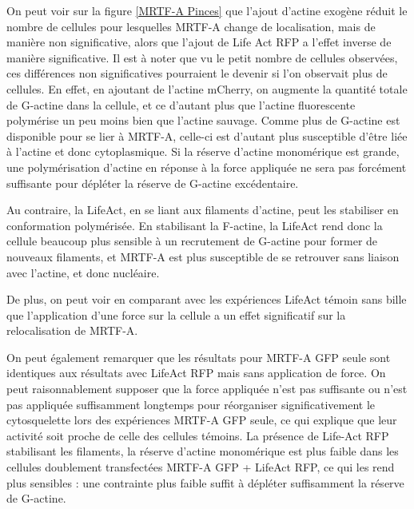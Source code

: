 On peut voir sur la figure \ref{MRTF-A Pinces} que l'ajout d'actine exogène réduit le nombre de cellules pour lesquelles MRTF-A change de localisation, mais de manière non significative, alors que l'ajout de Life Act RFP a l'effet inverse de manière significative. Il est à noter que vu le petit nombre de cellules observées, ces différences non significatives pourraient le devenir si l'on observait plus de cellules. 
En effet, en ajoutant de l'actine mCherry, on augmente la quantité totale de G-actine dans la cellule, et ce d'autant plus que l'actine fluorescente polymérise un peu moins bien que l'actine sauvage. Comme plus de G-actine est disponible pour se lier à MRTF-A, celle-ci est d'autant plus susceptible d'être liée à l'actine et donc cytoplasmique. 
Si la réserve d'actine monomérique est grande, une polymérisation d'actine en réponse à la force appliquée ne sera pas forcément suffisante pour dépléter la réserve de G-actine excédentaire.

Au contraire, la LifeAct, en se liant aux filaments d'actine, peut les stabiliser en conformation polymérisée. En stabilisant la F-actine, la LifeAct rend donc la cellule beaucoup plus sensible à un recrutement de G-actine pour former de nouveaux filaments, et MRTF-A est plus susceptible de se retrouver sans liaison avec l'actine, et donc nucléaire.

De plus, on peut voir en comparant avec les expériences LifeAct témoin sans bille que l'application d'une force sur la cellule a un effet significatif sur la relocalisation de MRTF-A. 

On peut également remarquer que les résultats pour MRTF-A GFP seule sont identiques aux résultats avec LifeAct RFP mais sans application de force. 
On peut raisonnablement supposer que la force appliquée n'est pas suffisante ou n'est pas appliquée suffisamment longtemps pour réorganiser significativement le cytosquelette lors des expériences MRTF-A GFP seule, ce qui explique que leur activité soit proche de celle des cellules témoins. 
La présence de Life-Act RFP stabilisant les filaments, la réserve d'actine monomérique est plus faible dans les cellules doublement transfectées MRTF-A GFP + LifeAct RFP, ce qui les rend plus sensibles : une contrainte plus faible suffit à dépléter suffisamment la réserve de G-actine. 

